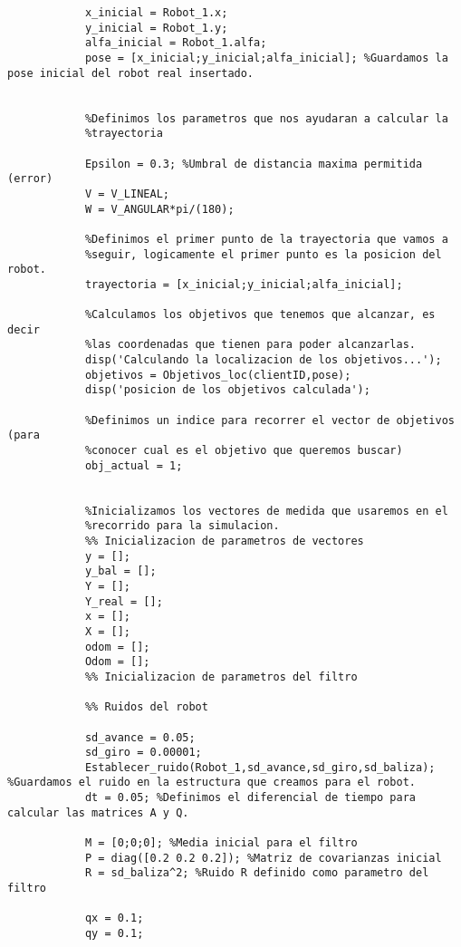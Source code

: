 \begin{lstlisting}[frame=single]
            %Definimos la pose inicial que tendra nuestro robot
            x_inicial = Robot_1.x;
            y_inicial = Robot_1.y;
            alfa_inicial = Robot_1.alfa;
            pose = [x_inicial;y_inicial;alfa_inicial]; %Guardamos la pose inicial del robot real insertado.


            %Definimos los parametros que nos ayudaran a calcular la
            %trayectoria

            Epsilon = 0.3; %Umbral de distancia maxima permitida (error)
            V = V_LINEAL;
            W = V_ANGULAR*pi/(180);

            %Definimos el primer punto de la trayectoria que vamos a
            %seguir, logicamente el primer punto es la posicion del robot.
            trayectoria = [x_inicial;y_inicial;alfa_inicial];

            %Calculamos los objetivos que tenemos que alcanzar, es decir
            %las coordenadas que tienen para poder alcanzarlas.
            disp('Calculando la localizacion de los objetivos...');
            objetivos = Objetivos_loc(clientID,pose);
            disp('posicion de los objetivos calculada');

            %Definimos un indice para recorrer el vector de objetivos (para
            %conocer cual es el objetivo que queremos buscar)
            obj_actual = 1;
            

            %Inicializamos los vectores de medida que usaremos en el
            %recorrido para la simulacion.
            %% Inicializacion de parametros de vectores
            y = [];
            y_bal = [];
            Y = [];
            Y_real = [];
            x = [];
            X = [];
            odom = [];
            Odom = [];
            %% Inicializacion de parametros del filtro
            
            %% Ruidos del robot
            
            sd_avance = 0.05;
            sd_giro = 0.00001;
            Establecer_ruido(Robot_1,sd_avance,sd_giro,sd_baliza); %Guardamos el ruido en la estructura que creamos para el robot.
            dt = 0.05; %Definimos el diferencial de tiempo para calcular las matrices A y Q.

            M = [0;0;0]; %Media inicial para el filtro
            P = diag([0.2 0.2 0.2]); %Matriz de covarianzas inicial
            R = sd_baliza^2; %Ruido R definido como parametro del filtro 

            qx = 0.1;
            qy = 0.1;


\end{lstlisting}
